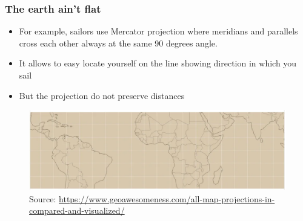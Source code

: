 \documentclass[
  shownotes,
  xcolor={svgnames},
  hyperref={colorlinks,citecolor=DarkBlue,linkcolor=DarkRed,urlcolor=DarkBlue}
   , aspectratio=169]{beamer}
\begin{document}
\begin{frame}[fragile]
\frametitle{The earth ain't flat}
\begin{itemize}
	\footnotesize
	\item For example, sailors use Mercator projection where meridians and parallels cross each other always at the same 90 degrees angle.
	\medskip
	\item It allows to easy locate yourself on the line showing direction in which you sail
	\medskip
	\item But the projection do not preserve  distances
\end{itemize}
 

\begin{figure}[H] \centering
            \captionsetup{justification=centering}
				\includegraphics[scale=0.3]{figures/Mercator}
				\\
				\tiny
				Source: \url{https://www.geoawesomeness.com/all-map-projections-in-compared-and-visualized/}
 \end{figure}


\end{frame}
\end{document}
